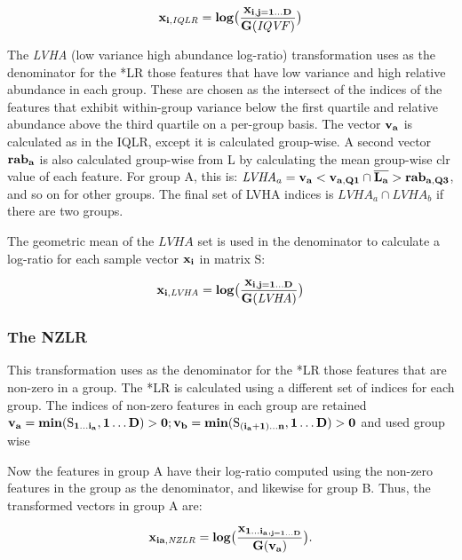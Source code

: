 \documentclass{bmcart}
\begin{document}
\begin{equation}
\bf{x}_{i, \mathit{IQLR}} = log  \big( \frac{\bf{x}_{i,j=1 \dots D}}{G(\mathit{IQVF})}   \big)_{}
\label{eq:iqlr}
\end{equation}

The \emph{LVHA} (low variance high abundance log-ratio) transformation uses as the denominator for the *LR those features that have low variance and high relative abundance in each group. These are chosen as the intersect of the indices of the features that exhibit within-group variance below the first quartile and relative abundance above the third quartile on a per-group basis. The vector $\bf{v}_a$ is calculated as in the IQLR, except it is calculated group-wise. A second vector $\bf{rab}_a$ is also calculated group-wise from L by calculating the mean group-wise clr value of each feature. For group A, this is: $\mathit{LVHA}_a = \bf{v}_a < \bf{v}_{a,Q1} \cap \overline{L_a }> \bf{rab}_{a, Q3}$, and so on for other groups. The final set of LVHA indices is $\mathit{LVHA}_a \cap \mathit{LVHA}_b$ if there are two groups.

The geometric mean of the $\mathit{LVHA}$ set is used in the denominator to calculate a log-ratio for each sample vector $\bf{x}_i$ in matrix S:

\begin{equation}
\bf{x}_{i, \mathit{LVHA}} = log  \big( \frac{\bf{x}_{i,j=1 \dots D}}{G(\mathit{LVHA})}   \big)_{}
\label{eq:vale}
\end{equation}

\subsubsection*{The NZLR}

This transformation uses as the denominator for the *LR those features that are non-zero in a group. The *LR is calculated using a different set of indices for each group. The indices of non-zero features in each group are retained $\bf{v}_a = min(\mathrm{S}_{1 \ldots i_a}, 1 \ldots D) > 0;\bf{v}_b = min(\mathrm{S}_{(i_a+1) \ldots n}, 1 \ldots D) > 0 $ and used group wise

Now the features in group A have their log-ratio computed using the non-zero features in the group as the denominator, and likewise for group B. Thus, the transformed vectors in group A are:

\begin{equation}
\bf{x}_{ia, \mathit{NZLR}} = log \big( \frac{x_{1 \ldots i_a,_{j=1 \dots D}}}{G(\mathit{\bf{v}_a})} \big).\label{eq:iqlr}
\end{equation}
\end{document}
